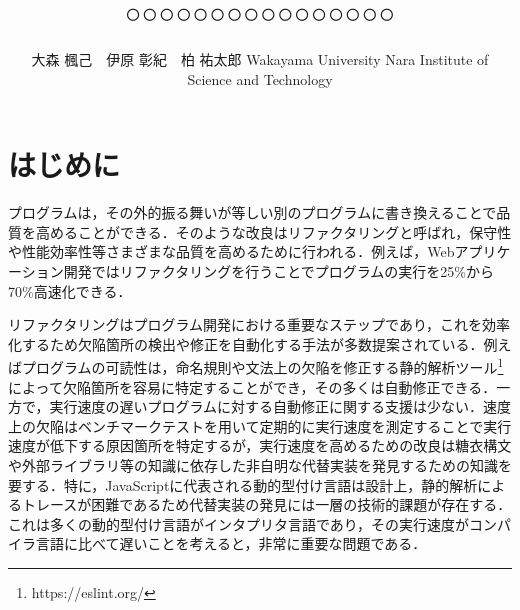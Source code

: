 \documentclass[T,J]{fose} %
\begin{document}
\title{○○○○○○○○○○○○○○○○}

\author{大森 楓己　伊原 彰紀　柏 祐太郎
\ejtitle{\etitle}
{Wakayama University}
{Nara Institute of Science and Technology}
}

\maketitle \thispagestyle {empty}

\section{はじめに}
プログラムは，その外的振る舞いが等しい別のプログラムに書き換えることで品質を高めることができる．そのような改良はリファクタリングと呼ばれ，保守性や性能効率性等さまざまな品質を高めるために行われる．例えば，Webアプリケーション開発ではリファクタリングを行うことでプログラムの実行を25\%から70\%高速化できる\cite{Selakovic_2016}．

リファクタリングはプログラム開発における重要なステップであり，これを効率化するため欠陥箇所の検出や修正を自動化する手法が多数提案されている．例えばプログラムの可読性は，命名規則や文法上の欠陥を修正する静的解析ツール\footnote{https://eslint.org/}によって欠陥箇所を容易に特定することができ，その多くは自動修正できる．一方で，実行速度の遅いプログラムに対する自動修正に関する支援は少ない．速度上の欠陥はベンチマークテストを用いて定期的に実行速度を測定することで実行速度が低下する原因箇所を特定するが，実行速度を高めるための改良は糖衣構文や外部ライブラリ等の知識に依存した非自明な代替実装を発見するための知識を要する．特に，JavaScriptに代表される動的型付け言語は設計上，静的解析によるトレースが困難であるため代替実装の発見には一層の技術的課題が存在する．これは多くの動的型付け言語がインタプリタ言語であり，その実行速度がコンパイラ言語に比べて遅いことを考えると，非常に重要な問題である．
\end{document}
